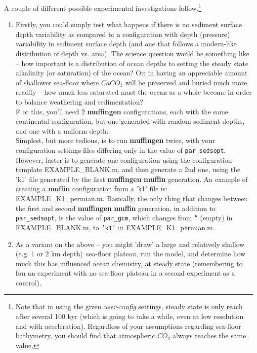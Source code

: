 \noindent A couple of different possible experimental investigations follow.\footnote{Note that in using the given \textit{user-config} settings, steady state is only reach after several 100 kyr (which is going to take a while, even at low resolution and with acceleration). Regardless of your assumptions regarding sea-floor bathymetry, you should find that atmospheric \(CO_{2}\) always reaches the same value.
}
\begin{enumerate}[noitemsep]

\vspace{1mm}
\item Firstly, you could simply test what happens if there is no sediment surface depth variability as compared to a configuration with depth (pressure) variability in sediment surface depth (and one that follows a modern-like distribution of depth vs. area). The science question would be something like -- how important is a distribution of ocean depths to setting the steady state alkalinity (or saturation) of the ocean? Or: in having an appreciable amount of shallower sea-floor where \(CaCO_{3}\) will be preserved and buried much more readily -- how much less saturated must the ocean as a whole become in order to balance weathering and sedimentation?
\\F or this, you'll need 2 \textbf{muffingen} configurations, each with the same continental configuration, but one generated with random sediment depths, and one with a uniform depth.
\\Simplest, but more tedious, is to run \textbf{muffingen} twice, with your  configuration settings files differing only in the value of \texttt{par\_sedsopt}. However, faster is to generate one configuration using the configuration template \textsf{\footnotesize EXAMPLE\_BLANK.m}, and then generate a 2nd one, using the 'k1' file generated by the first \textbf{muffingen} \textbf{muffin} generation. An example of creating a \textbf{muffin} configuration from a 'k1' file is: \textsf{\footnotesize EXAMPLE\_K1\_permian.m}. Basically, the only thing that changes between the first and second \textbf{muffingen} \textbf{muffin} generation, in addition to \texttt{par\_sedsopt}, is the value of \texttt{par\_gcm}, which changes from \texttt{''} (empty) in \textsf{\footnotesize EXAMPLE\_BLANK.m}, to \texttt{'k1'} in \textsf{\footnotesize EXAMPLE\_K1\_permian.m}.

\vspace{1mm}
\item As a variant on the above -- you might 'draw' a large and relatively shallow (e.g. 1 or 2 km depth)\ sea-floor plateau, run the model, and determine how much this has influenced ocean chemistry, at steady state (remembering to fun an experiment with no sea-floor plateau in a second experiment as a control).


\end{enumerate}
